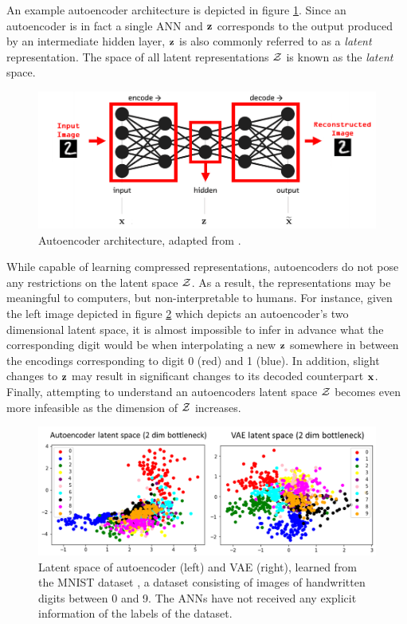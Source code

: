 An example autoencoder architecture is depicted in figure \ref{fig:autoencoder}. Since an autoencoder is in fact a single ANN and $\mathbf{z}$ corresponds to the output produced by an intermediate hidden layer, $\mathbf{z}$ is also commonly referred to as a \textit{latent} representation. The space of all latent representations $\mathcal{Z}$ is known as the \textit{latent} space.
	\begin{figure}
		\centering
		\includegraphics[width=0.7\linewidth]{autoencoder}
		\caption{Autoencoder architecture, adapted from \cite{karagiannakosHowGenerateImages2018}.}
		\label{fig:autoencoder}
	\end{figure}
While capable of learning compressed representations, autoencoders do not pose any restrictions on the latent space $\mathcal{Z}$. As a result, the representations may be meaningful to computers, but non-interpretable to humans. For instance, given the left image depicted in figure \ref{fig:latent_space_2d} which depicts an autoencoder's two dimensional latent space, it is almost impossible to infer in advance what the corresponding digit would be when interpolating a new $\mathbf{z}$ somewhere in between the encodings corresponding to digit 0 (red) and 1 (blue). In addition, slight changes to $\mathbf{z}$ may result in significant changes to its decoded counterpart $\mathbf{x}$. Finally, attempting to understand an autoencoders latent space $\mathcal{Z}$ becomes even more infeasible as the dimension of $\mathcal{Z}$ increases.

\begin{figure}
	\centering
	\includegraphics[width=0.7\linewidth]{screenshot021}
	\caption{ Latent space of autoencoder (left) and VAE (right), learned from the MNIST dataset \cite{lecunGradientbasedLearningApplied1998}, a dataset consisting of images of handwritten digits between 0 and 9. The ANNs have not received any explicit information of the labels of the dataset. 
}
	\label{fig:latent_space_2d}
\end{figure}



